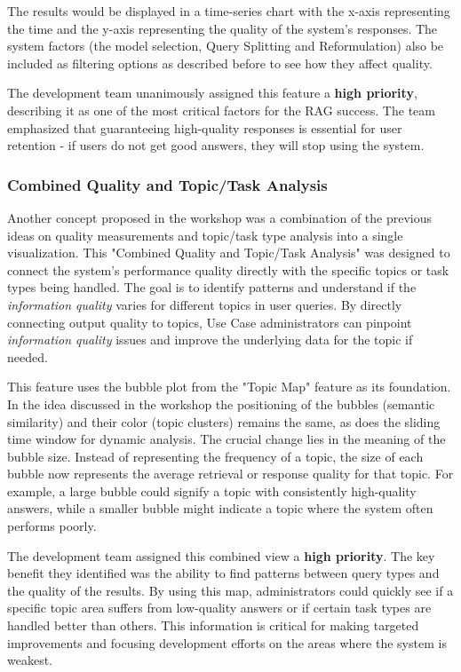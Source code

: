 \documentclass[
	english,
	ruledheaders=section,%
	class=report,%
	thesis={type=bachelor},%
	accentcolor=1b,%
	custommargins=true,%
	marginpar=false,%
	parskip=half-,%
	fontsize=11pt,%
	DIV=14,
]{tudapub}
\begin{document}
The results would be displayed in a time-series chart with the x-axis representing the time and the y-axis representing the quality of the system's responses. The system factors (the model selection, Query Splitting and Reformulation) also be included as filtering options as described before to see how they affect quality.

The development team unanimously assigned this feature a \textbf{high priority}, describing it as one of the most critical factors for the RAG success. The team emphasized that guaranteeing high-quality responses is essential for user retention - if users do not get good answers, they will stop using the system.
\subsubsection{Combined Quality and Topic/Task Analysis}
Another concept proposed in the workshop was a combination of the previous ideas on quality measurements and topic/task type analysis into a single visualization. This "Combined Quality and Topic/Task Analysis" was designed to connect the system's performance quality directly with the specific topics or task types being handled. The goal is to identify patterns and understand if the \textit{information quality} varies for different topics in user queries. By directly connecting output quality to topics, Use Case administrators can pinpoint \textit{information quality} issues and improve the underlying data for the topic if needed.

This feature uses the bubble plot from the "Topic Map" feature as its foundation. In the idea discussed in the workshop the positioning of the bubbles (semantic similarity) and their color (topic clusters) remains the same, as does the sliding time window for dynamic analysis. The crucial change lies in the meaning of the bubble size. Instead of representing the frequency of a topic, the size of each bubble now represents the average retrieval or response quality for that topic. For example, a large bubble could signify a topic with consistently high-quality answers, while a smaller bubble might indicate a topic where the system often performs poorly.

The development team assigned this combined view a \textbf{high priority}. The key benefit they identified was the ability to find patterns between query types and the quality of the results. By using this map, administrators could quickly see if a specific topic area suffers from low-quality answers or if certain task types are handled better than others. This information is critical for making targeted improvements and focusing development efforts on the areas where the system is weakest.
\end{document}
